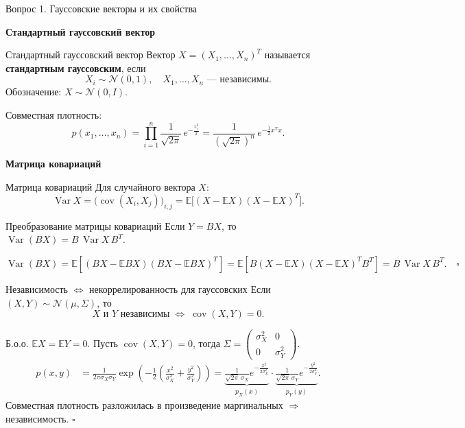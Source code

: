 \documentclass[12pt, a4paper]{article}
\newcommand{\question}[2]{%
  \newpage%
  \noindent\colorbox{qcolor}{\parbox{\dimexpr\linewidth-2\fboxsep\relax}{%
    \color{white}\large\bfseries\strut Вопрос #1. #2%
  }}%
  \vspace{6pt}%
}
\newcommand{\qsub}[1]{%
  \vspace{6pt}%
  {\bfseries\color{defblue} #1}%
  \par\vspace{2pt}%
}
\newcommand{\cov}{\operatorname{cov}}
\newcommand{\Var}{\operatorname{Var}}
\newcommand{\E}{\mathbb{E}}
\begin{document}
\question{1}{Гауссовские векторы и их свойства}

\qsub{Стандартный гауссовский вектор}

\begin{defbox}{Стандартный гауссовский вектор}
Вектор $X = (X_1, \ldots, X_n)^T$ называется \textbf{стандартным гауссовским}, если
\[
  X_i \sim \mathcal{N}(0,1), \quad X_1,\ldots,X_n \text{ --- независимы.}
\]
Обозначение: $X \sim \mathcal{N}(0, I)$.

Совместная плотность:
\[
  p(x_1,\ldots,x_n)
  = \prod_{i=1}^{n}\frac{1}{\sqrt{2\pi}}\,e^{-\frac{x_i^2}{2}}
  = \frac{1}{(\sqrt{2\pi})^n}\,e^{-\frac{1}{2}x^Tx}.
\]
\end{defbox}

\qsub{Матрица ковариаций}

\begin{defbox}{Матрица ковариаций}
Для случайного вектора $X$:
\[
  \Var X = \bigl(\cov(X_i,X_j)\bigr)_{i,j} = \E\bigl[(X-\E X)(X-\E X)^T\bigr].
\]
\end{defbox}

\begin{propbox}{Преобразование матрицы ковариаций}
Если $Y = BX$, то $\Var(BX) = B\,\Var X\,B^T$.
\end{propbox}

\begin{proofbox}
\[
  \Var(BX) = \E[(BX - \E BX)(BX-\E BX)^T]
  = \E[B(X-\E X)(X-\E X)^T B^T]
  = B\,\Var X\,B^T. \quad\square
\]
\end{proofbox}

\begin{thmbox}{Независимость $\Leftrightarrow$ некоррелированность для гауссовских}
Если $(X,Y)\sim\mathcal{N}(\mu,\Sigma)$, то
\[
  X \text{ и } Y \text{ независимы} \;\iff\; \cov(X,Y) = 0.
\]
\end{thmbox}

\begin{proofbox}
Б.о.о. $\E X = \E Y = 0$. Пусть $\cov(X,Y)=0$, тогда
$\Sigma = \begin{pmatrix}\sigma_X^2 & 0\\0 & \sigma_Y^2\end{pmatrix}$.
\begin{align*}
  p(x,y)
  &= \frac{1}{2\pi\sigma_X\sigma_Y}
     \exp\!\left(-\tfrac{1}{2}\!\left(\tfrac{x^2}{\sigma_X^2}+\tfrac{y^2}{\sigma_Y^2}\right)\right)
   = \underbrace{\frac{1}{\sqrt{2\pi}\,\sigma_X}e^{-\frac{x^2}{2\sigma_X^2}}}_{p_X(x)}
   \cdot
     \underbrace{\frac{1}{\sqrt{2\pi}\,\sigma_Y}e^{-\frac{y^2}{2\sigma_Y^2}}}_{p_Y(y)}.
\end{align*}
Совместная плотность разложилась в произведение маргинальных $\Rightarrow$ независимость. $\square$
\end{proofbox}
\end{document}
